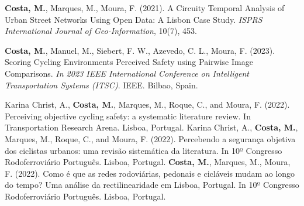 
\begin{cvpublications}
  \cvpublication
    {\textbf{Costa, M.}, Marques, M., Moura, F. (2021). A Circuity Temporal Analysis of Urban Street Networks Using Open Data: A Lisbon Case Study. \textit{ISPRS International Journal of Geo-Information}, 10(7), 453.}

\end{cvpublications}




\begin{cvpublications}
\cvpublication
	{\textbf{Costa, M.}, Manuel, M., Siebert, F. W., Azevedo, C. L., Moura, F. (2023). Scoring Cycling Environments Perceived Safety using Pairwise Image Comparisons. \textit{In 2023 IEEE International Conference on Intelligent Transportation Systems (ITSC)}. IEEE. Bilbao, Spain.}
\end{cvpublications}


\begin{cvpublications}

\cvpublication
	{Karina Christ, A., \textbf{Costa, M.}, Marques, M., Roque, C., and Moura, F. (2022). Perceiving objective cycling safety: a systematic literature review. In Transportation Research Arena. Lisboa, Portugal.}
  \cvpublication
    {Karina Christ, A., \textbf{Costa, M.}, Marques, M., Roque, C., and Moura, F. (2022). Percebendo a segurança objetiva dos ciclistas urbanos: uma revisão sistemática da literatura. In 10º Congresso Rodoferroviário Português. Lisboa, Portugal.}
  \cvpublication
    {\textbf{Costa, M.}, Marques, M., Moura, F. (2022). Como é que as redes rodoviárias, pedonais e cicláveis mudam ao longo do tempo? Uma análise da rectilinearidade em Lisboa, Portugal. In 10º Congresso Rodoferroviário Português. Lisboa, Portugal.}

\end{cvpublications}


